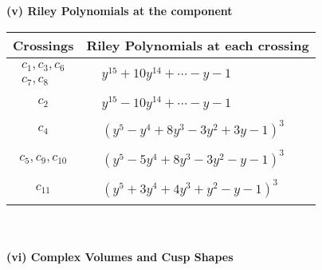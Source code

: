 \documentclass[1p]{elsarticle_modified}
\theoremstyle{definition}
\begin{document}
\newpage\renewcommand{\arraystretch}{1}
\flushleft \textbf{(v) Riley Polynomials at the component}\newline \\
\begin{tabular}{m{50pt}|m{274pt}}
Crossings & \hspace{64pt}Riley Polynomials at each crossing \\
\hline $$\begin{aligned}c_{1},c_{3},c_{6}\\c_{7},c_{8}\end{aligned}$$&$\begin{aligned}
&y^{15}+10 y^{14}+\cdots- y-1
\end{aligned}$\\
\hline $$\begin{aligned}c_{2}\end{aligned}$$&$\begin{aligned}
&y^{15}-10 y^{14}+\cdots- y-1
\end{aligned}$\\
\hline $$\begin{aligned}c_{4}\end{aligned}$$&$\begin{aligned}
&(y^5- y^4+8 y^3-3 y^2+3 y-1)^3
\end{aligned}$\\
\hline $$\begin{aligned}c_{5},c_{9},c_{10}\end{aligned}$$&$\begin{aligned}
&(y^5-5 y^4+8 y^3-3 y^2- y-1)^3
\end{aligned}$\\
\hline $$\begin{aligned}c_{11}\end{aligned}$$&$\begin{aligned}
&(y^5+3 y^4+4 y^3+y^2- y-1)^3
\end{aligned}$\\
\hline
\end{tabular}\\~\\
\newpage\flushleft \textbf{(vi) Complex Volumes and Cusp Shapes}
\end{document}
